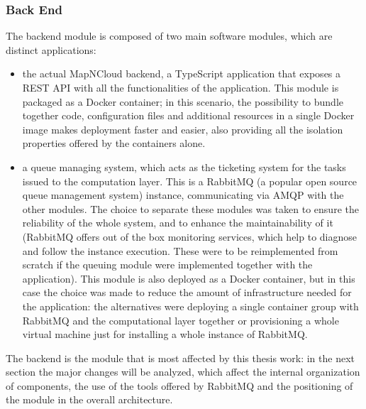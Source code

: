   \subsubsection{Back End}
  \label{ssse:originalbackend}
    The backend module is composed of two main software modules, which are distinct applications:
    \begin{itemize}
      \item the actual MapNCloud backend, a TypeScript application that exposes a REST API with all the functionalities of the application. This module is packaged as a Docker container; in this scenario, the possibility to bundle together code, configuration files and additional resources in a single Docker image makes deployment faster and easier, also providing all the isolation properties offered by the containers alone.
      \item a queue managing system, which acts as the ticketing system for the tasks issued to the computation layer. This is a RabbitMQ (a popular open source queue management system) instance, communicating via AMQP\cite{AMQP} with the other modules. The choice to separate these modules was taken to ensure the reliability of the whole system, and to enhance the maintainability of it (RabbitMQ offers out of the box monitoring services, which help to diagnose and follow the instance execution. These were to be reimplemented from scratch if the queuing module were implemented together with the application). This module is also deployed as a Docker container, but in this case the choice was made to reduce the amount of infrastructure needed for the application: the alternatives were deploying a single container group with RabbitMQ and the computational layer together or provisioning a whole virtual machine just for installing a whole instance of RabbitMQ.
    \end{itemize}
    The backend is the module that is most affected by this thesis work: in the next section the major changes will be analyzed, which affect the internal organization of components, the use of the tools offered by RabbitMQ and the positioning of the module in the overall architecture.
  
